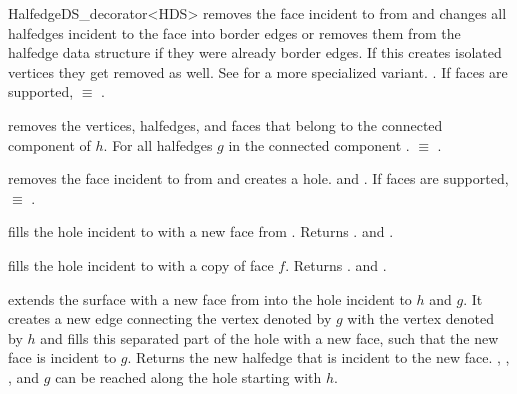 \begin{ccRefClass}{HalfedgeDS_decorator<HDS>}
 {removes the
   face incident to  from  and changes all halfedges
   incident to the face into border edges or removes them from the
   halfedge data structure if they were already border edges. If this
   creates isolated vertices they get removed as well. See
    for a more specialized variant.  
   \ccPrecond {}. 
    If faces are supported,
    $\equiv$ .}

    {removes the  vertices, halfedges, and faces that belong to the 
     connected component of $h$. \ccPrecond For all halfedges $g$ in the 
     connected component .
        $\equiv$
     .}



   {removes the face incident to  from  and creates a hole.
    \ccPrecond {} and . 
     If faces are supported,  
     $\equiv$ .}

   {fills the hole incident to  with a new face from .
    Returns .
    \ccPrecond {} and .}

   {fills the hole incident to  with a copy of face $f$.
    Returns .
    \ccPrecond {} and .}

   {extends the surface with a new face from  into the hole 
    incident to $h$ and $g$. It creates a new edge connecting the vertex
    denoted by $g$ with the vertex denoted by $h$ and fills this separated 
    part of the hole with a new face, such that the new face is incident 
    to $g$. Returns the new halfedge that is incident to the new face.
    \ccPrecond {}, ,
    ,  and $g$ can be reached 
    along the hole starting with $h$.}


\end{ccRefClass}
